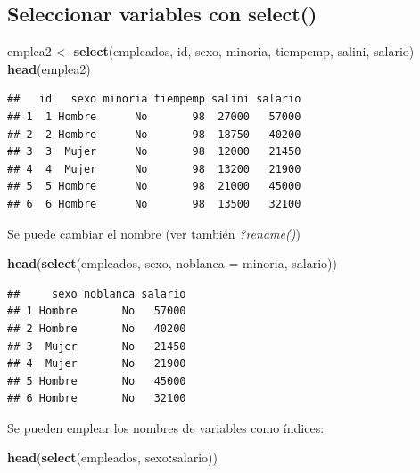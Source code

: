 \documentclass[]{book}
\newenvironment{Shaded}{\begin{snugshade}}{\end{snugshade}}
\newcommand{\KeywordTok}[1]{\textcolor[rgb]{0.13,0.29,0.53}{\textbf{#1}}}
\newcommand{\DataTypeTok}[1]{\textcolor[rgb]{0.13,0.29,0.53}{#1}}
\newcommand{\StringTok}[1]{\textcolor[rgb]{0.31,0.60,0.02}{#1}}
\newcommand{\OperatorTok}[1]{\textcolor[rgb]{0.81,0.36,0.00}{\textbf{#1}}}
\newcommand{\NormalTok}[1]{#1}
\begin{document}
\subsection{\texorpdfstring{Seleccionar variables con
\textbf{select()}}{Seleccionar variables con select()}}\label{seleccionar-variables-con-select}

\begin{Shaded}
\begin{Highlighting}[]
\NormalTok{emplea2 <-}\StringTok{ }\KeywordTok{select}\NormalTok{(empleados, id, sexo, minoria, tiempemp, salini, salario)}
\KeywordTok{head}\NormalTok{(emplea2)}
\end{Highlighting}
\end{Shaded}

\begin{verbatim}
##   id   sexo minoria tiempemp salini salario
## 1  1 Hombre      No       98  27000   57000
## 2  2 Hombre      No       98  18750   40200
## 3  3  Mujer      No       98  12000   21450
## 4  4  Mujer      No       98  13200   21900
## 5  5 Hombre      No       98  21000   45000
## 6  6 Hombre      No       98  13500   32100
\end{verbatim}

Se puede cambiar el nombre (ver también \emph{?rename()})

\begin{Shaded}
\begin{Highlighting}[]
\KeywordTok{head}\NormalTok{(}\KeywordTok{select}\NormalTok{(empleados, sexo, }\DataTypeTok{noblanca =}\NormalTok{ minoria, salario))}
\end{Highlighting}
\end{Shaded}

\begin{verbatim}
##     sexo noblanca salario
## 1 Hombre       No   57000
## 2 Hombre       No   40200
## 3  Mujer       No   21450
## 4  Mujer       No   21900
## 5 Hombre       No   45000
## 6 Hombre       No   32100
\end{verbatim}

Se pueden emplear los nombres de variables como índices:

\begin{Shaded}
\begin{Highlighting}[]
\KeywordTok{head}\NormalTok{(}\KeywordTok{select}\NormalTok{(empleados, sexo}\OperatorTok{:}\NormalTok{salario))}
\end{Highlighting}
\end{Shaded}
\end{document}
